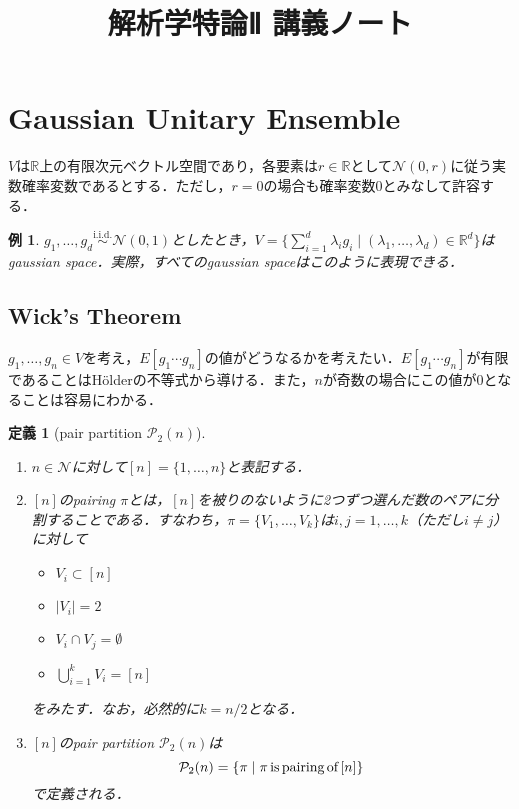 \documentclass{ltjsarticle}
\title{解析学特論Ⅱ 講義ノート}
\author{}
\date{}
\theoremstyle{mystyle1}
\newtheorem{dfn}{定義}[section]
\theoremstyle{mystyle2}
\newtheorem{example}{例}
\theoremstyle{mystyle3}
\begin{document}
\maketitle

\section{Gaussian Unitary Ensemble}

$V$は$\mathbb{R}$上の有限次元ベクトル空間であり，各要素は$r\in\mathbb{R}$として$\mathcal{N}(0,r)$に従う実数確率変数であるとする．ただし，$r=0$の場合も確率変数$0$とみなして許容する．

\begin{example}
    $g_1,\ldots,g_d\overset{\textrm{i.i.d.}}{\sim}\mathcal{N}(0,1)$としたとき，$V=\{\sum_{i=1}^d \lambda_ig_i\mid (\lambda_1,\ldots,\lambda_d)\in\mathbb{R}^d\}$はgaussian space．実際，すべてのgaussian spaceはこのように表現できる．
\end{example}

\subsection{Wick's Theorem}

$g_1,\ldots,g_n\in V$を考え，$E[g_1\cdots g_n]$の値がどうなるかを考えたい．$E[g_1\cdots g_n]$が有限であることはHölderの不等式から導ける．また，$n$が奇数の場合にこの値が0となることは容易にわかる．

\begin{dfn}[pair partition $\mathcal{P}_2(n)$]\
    \vspace{-\baselineskip}
    \begin{enumerate}
        \item $n\in\mathcal{N}$に対して$[n]=\{1,\ldots,n\}$と表記する．
        \item $[n]$のpairing $\pi$とは，$[n]$を被りのないように2つずつ選んだ数のペアに分割することである．すなわち，$\pi=\{V_1,\ldots,V_k\}$は$i,j=1,\ldots,k$（ただし$i\neq j$）に対して
              \begin{itemize}
                  \item $V_i\subset [n]$
                  \item $|V_i|=2$
                  \item $V_i\cap V_j=\emptyset$
                  \item $\bigcup_{i=1}^k V_i=[n]$
              \end{itemize}
              をみたす．なお，必然的に$k=n/2$となる．
        \item $[n]$のpair partition $\mathcal{P}_2(n)$は
              \begin{equation}
                  \mathcal{P}_2(n)=\{\pi\mid\pi\textrm{\,is\,pairing\,of\,}[n]\}
              \end{equation}
              で定義される．
    \end{enumerate}
\end{dfn}
\end{document}
